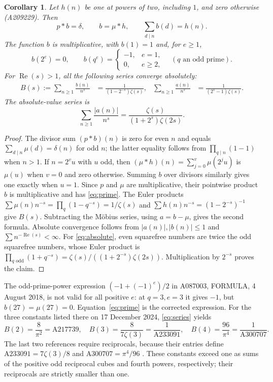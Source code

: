 \documentclass[11pt]{article}
\newtheorem{corollary}[theorem]{Corollary}
\newcommand{\Rea}{\operatorname{Re}}
\begin{document}
\begin{corollary}\label{cor:dirichlet}
Let $h(n)$ be one at powers of two, including $1$, and zero otherwise
(A209229). Then
\[
 p*b=\delta,\qquad b=\mu*h,\qquad
 \sum_{d\mid n}b(d)=h(n).
\]
The function $b$ is multiplicative, with $b(1)=1$ and, for $e\geq1$,
\begin{equation}\label{eq:prime}
 b(2^e)=0,\qquad
 b(q^e)=\begin{cases}-1,&e=1,\\0,&e\geq2,\end{cases}
 \quad(q\text{ an odd prime}).
\end{equation}
For $\Rea(s)>1$, all the following series converge absolutely:
\begin{align}
 B(s):=\sum_{n\geq1}\frac{b(n)}{n^s}
 &=\frac{1}{(1-2^{-s})\zeta(s)},&
 \sum_{n\geq1}\frac{a(n)}{n^s}
 &=\frac{1}{(2^s-1)\zeta(s)}.\label{eq:series}
\end{align}
The absolute-value series is
\begin{equation}\label{eq:absolute}
 \sum_{n\geq1}\frac{|a(n)|}{n^s}
 =\frac{\zeta(s)}{(1+2^s)\zeta(2s)}.
\end{equation}
\end{corollary}
\begin{proof}
The divisor sum $(p*b)(n)$ is zero for even $n$ and equals
$\sum_{d\mid n}\mu(d)=\delta(n)$ for odd $n$; the latter equality
follows from $\prod_{q\mid n}(1-1)$ when $n>1$.
If $n=2^v u$ with $u$ odd, then
$(\mu*h)(n)=\sum_{j=0}^v\mu(2^j u)$ is $\mu(u)$ when $v=0$
and zero otherwise. Summing $b$ over divisors similarly gives one
exactly when $u=1$. Since $p$ and $\mu$ are multiplicative, their
pointwise product $b$ is multiplicative and has \eqref{eq:prime}.
The Euler products
$\sum\mu(n)n^{-s}=\prod_q(1-q^{-s})=1/\zeta(s)$ and
$\sum h(n)n^{-s}=(1-2^{-s})^{-1}$ give $B(s)$.
Subtracting the M\"obius series, using $a=b-\mu$, gives the second
formula. Absolute convergence follows from $|a(n)|,|b(n)|\leq1$ and
$\sum n^{-\Rea(s)}<\infty$.
For \eqref{eq:absolute}, even squarefree numbers are twice the odd
squarefree numbers, whose Euler product is
$\prod_{q\text{ odd}}(1+q^{-s})
=\zeta(s)/((1+2^{-s})\zeta(2s))$.
Multiplication by $2^{-s}$ proves the claim.
\end{proof}

The odd-prime-power expression $(-1+(-1)^e)/2$ in A087003,
FORMULA, 4 August 2018, is not valid for all positive $e$:
at $q=3,e=3$ it gives $-1$, but $b(27)=\mu(27)=0$.
Equation~\eqref{eq:prime} is the corrected expression.
For the three constants listed there on 17 December 2024,
\eqref{eq:series} yields
\begin{equation}\label{eq:constants}
 B(2)=\frac8{\pi^2}=\mathrm{A217739},\quad
 B(3)=\frac8{7\zeta(3)}=\frac1{\mathrm{A233091}},\quad
 B(4)=\frac{96}{\pi^4}=\frac1{\mathrm{A300707}}.
\end{equation}
The last two references require reciprocals, because their entries
define $\mathrm{A233091}=7\zeta(3)/8$ and
$\mathrm{A300707}=\pi^4/96$ \cite{constants}. These constants exceed
one as sums of the positive odd reciprocal cubes and fourth powers,
respectively; their reciprocals are strictly smaller than one.
\end{document}
